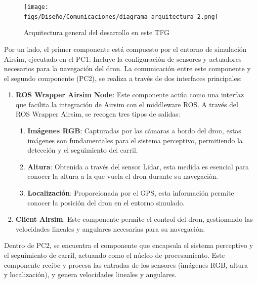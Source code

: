 \begin{figure} [H]
  \begin{center}
    \texttt{[image: figs/Diseño/Comunicaciones/diagrama\_arquitectura\_2.png]}
  \end{center}
  \caption{Arquitectura general del desarrollo en este TFG}
  \label{fig:infraestructura}
  \vspace{-1.5em}
\end{figure}

Por un lado, el primer componente está compuesto por el entorno de simulación Airsim, ejecutado en el PC1. Incluye la configuración de sensores y actuadores necesarios 
para la navegación del dron. La comunicación entre este componente y el segundo componente (PC2), se realiza a través de dos interfaces principales: 

\begin{enumerate}
  \item \textbf{ROS Wrapper Airsim Node}: Este componente actúa como una interfaz que facilita la integración de Airsim con el middleware ROS. A través del ROS Wrapper Airsim, 
  se recogen tres tipos de salidas: 
    \begin{enumerate}
      \item \textbf{Imágenes RGB}: Capturadas por las cámaras a bordo del dron, estas imágenes son fundamentales para el sistema perceptivo, permitiendo la detección y el 
      seguimiento del carril.
      \item \textbf{Altura}: Obtenida a través del sensor Lidar, esta medida es esencial para conocer la altura a la que vuela el dron durante su navegación. 
      \item \textbf{Localización}: Proporcionada por el GPS, esta información permite conocer la posición del dron en el entorno simulado. 
    \end{enumerate}

  \item \textbf{Client Airsim}: Este componente permite el control del dron, gestionando las velocidades lineales y angulares necesarias para su navegación. 
\end{enumerate}

Dentro de PC2, se encuentra el componente que encapsula el sistema perceptivo y el seguimiento de carril, actuando como el núcleo de 
procesamiento. Este componente recibe y procesa las entradas de los sensores (imágenes RGB, altura y localización), y genera velocidades lineales y angulares.

